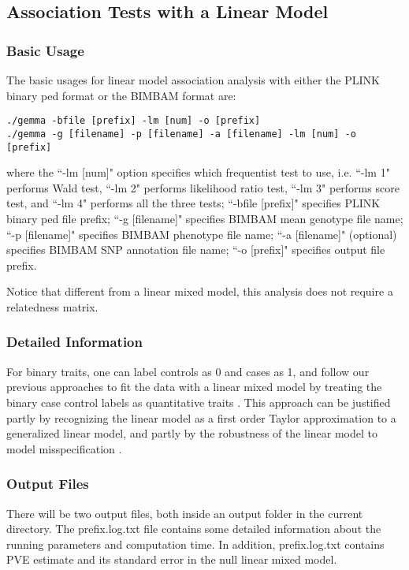 \documentclass[11pt]{article}
\begin{document}
\subsection{Association Tests with a Linear Model}
\subsubsection{Basic Usage}
The basic usages for linear model association analysis with either the PLINK binary ped format or the BIMBAM format are:
\begin{verbatim}
./gemma -bfile [prefix] -lm [num] -o [prefix]
./gemma -g [filename] -p [filename] -a [filename] -lm [num] -o [prefix]
\end{verbatim}
where the ``-lm [num]" option specifies which frequentist test to use, i.e. ``-lm 1" performs Wald test, ``-lm 2" performs likelihood ratio test, ``-lm 3" performs score test, and ``-lm 4" performs all the three tests; ``-bfile [prefix]" specifies PLINK binary ped file prefix; ``-g [filename]" specifies BIMBAM mean genotype file name; ``-p [filename]" specifies BIMBAM phenotype file name; ``-a [filename]" (optional) specifies BIMBAM SNP annotation file name; ``-o [prefix]" specifies output file prefix. 

Notice that different from a linear mixed model, this analysis does not require a relatedness matrix. 

\subsubsection{Detailed Information}
For binary traits, one can label controls as 0 and cases as 1, and follow our previous approaches to fit the data with a linear mixed model by treating the binary case control labels as quantitative traits \cite{Zhou:2012, Zhou:2013}. This approach can be justified partly by recognizing the linear model as a first order Taylor approximation to a generalized linear model, and partly by the robustness of the linear model to model misspecification \cite{Zhou:2013}.


\subsubsection{Output Files}
There will be two output files, both inside an output folder in the current directory. The prefix.log.txt file contains some detailed information about the running parameters and computation time. In addition, prefix.log.txt contains PVE estimate and its standard error in the null linear mixed model.
\end{document}
